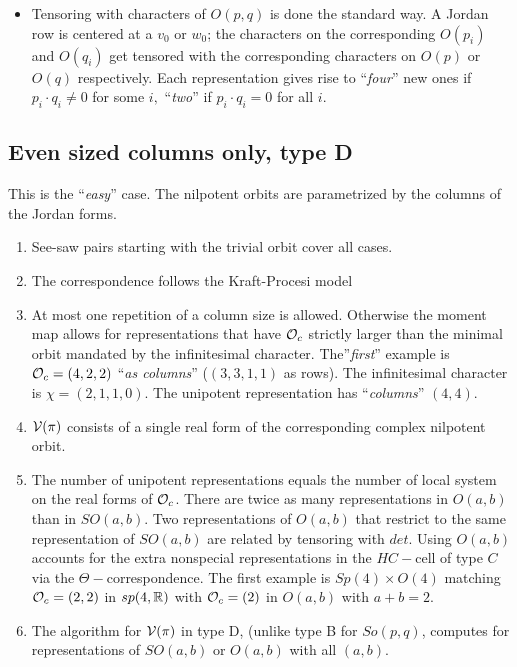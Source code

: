 \documentclass[11pt ,reqno]{amsart}
\begin{document}
\begin{itemize}
\item Tensoring with characters of $O(p,q)$ is done the standard
  way. A Jordan row is centered at a $v_0$ or  $w_0$; the characters
  on the corresponding $O(p_i)$ and $O(q_i)$ get tensored with the
  corresponding characters on $O(p)$ or $O(q)$ respectively. Each
  representation gives rise to ``\textit{four}'' new ones if $p_i\cdot q_i\ne 0$ 
  for some $i,$ ``\textit{two}'' if $p_i\cdot q_i=0$ for all $i.$ 

\end{itemize}
 



\subsection{Even sized columns only, type D} This is the  ``\textit{easy}''
case. The nilpotent orbits are parametrized by the columns of the
Jordan forms.
\begin{enumerate}
\item  See-saw pairs starting with the trivial orbit cover all
  cases.
\item The correspondence follows the Kraft-Procesi model
\item At most one repetition of a column size is allowed. Otherwise
  the moment map allows for representations that have $\mathcal O_c$ strictly
  larger than the minimal orbit mandated by the infinitesimal
  character. The''\textit{first}'' example is $\mathcal O_c=(4,2,2)$ ``\textit{as
  columns}'' ($(3,3,1,1)$ as rows). The infinitesimal character is
  $\chi=(2,1,1,0).$ The unipotent representation has
  ``\textit{columns}'' $(4,4).$
\item ${\mathcal V}(\pi)$ consists of a single real form of the corresponding
  complex nilpotent orbit.   
\item The number of unipotent representations equals the number of
  local system on the real forms of $\mathcal O_c$. There are twice as many
  representations in $O(a,b)$ than in $SO(a,b)$. Two representations
  of $O(a,b)$ that restrict to the same representation of $SO(a,b)$
  are related by tensoring with $det.$  Using $O(a,b)$ accounts for
  the extra nonspecial representations in the $HC-$cell of type
  $C$ via the $\Theta-$correspondence. The first example is $Sp(4)\times O(4)$ matching
  $\mathcal O_c=(2,2)$ in $sp(4,{\mathbb R})$ with $\mathcal O_c=(2)$ in $O(a,b)$ with   $a+b=2.$ 

\item The algorithm for ${\mathcal V}(\pi)$ in type D, (unlike type B for
  $So(p,q)$, computes for
  representations of $SO(a,b)$ or $O(a,b)$ with all $(a,b).$ 
\end{enumerate}
\end{document}
